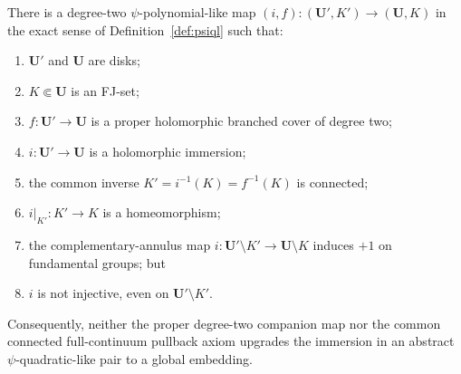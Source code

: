 \begin{theorem}\label{thm:psiql-nogo}
There is a degree-two \(\psi\)-polynomial-like map \((i,f):(\mathbf U',K')\to(\mathbf U,K)\) in the exact sense of Definition~\ref{def:psiql} such that:
\begin{enumerate}
\item \(\mathbf U'\) and \(\mathbf U\) are disks;
\item \(K\Subset\mathbf U\) is an FJ-set;
\item \(f:\mathbf U'\to\mathbf U\) is a proper holomorphic branched cover of degree two;
\item \(i:\mathbf U'\to\mathbf U\) is a holomorphic immersion;
\item the common inverse \(K'=i^{-1}(K)=f^{-1}(K)\) is connected;
\item \(i|_{K'}:K'\to K\) is a homeomorphism;
\item the complementary-annulus map \(i:\mathbf U'\setminus K'\to\mathbf U\setminus K\) induces \(+1\) on fundamental groups; but
\item \(i\) is not injective, even on \(\mathbf U'\setminus K'\).
\end{enumerate}
Consequently, neither the proper degree-two companion map nor the common connected full-continuum pullback axiom upgrades the immersion in an abstract \(\psi\)-quadratic-like pair to a global embedding.
\end{theorem}

